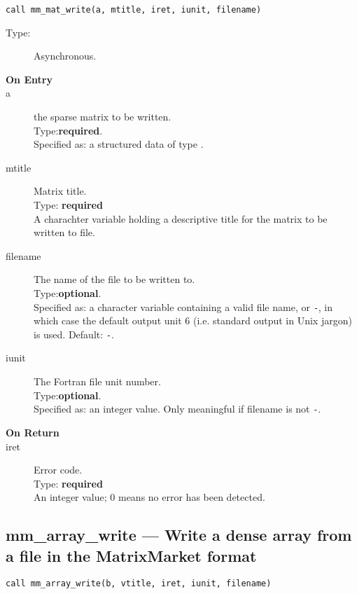 \begin{lstlisting}
call mm_mat_write(a, mtitle, iret, iunit, filename)
\end{lstlisting}
\begin{description}
\item[Type:] Asynchronous.
\item[\bf  On Entry ]
\item[a] the sparse matrix to be written.\\
Type:{\bf required}.\\
Specified as: a structured data of type \spdata.
\item[mtitle] Matrix title.\\
Type: {\bf required} \\
A charachter variable holding a descriptive title for the matrix to be
 written to file.
\item[filename] The name of the file to be written to.\\
Type:{\bf optional}.\\
Specified as: a character variable containing a valid file name, or
\verb|-|, in which case the default output unit  6 (i.e. standard output
in Unix jargon) is used. Default: \verb|-|. 
\item[iunit] The Fortran file unit number.\\
Type:{\bf optional}.\\
Specified as: an integer value. Only meaningful if filename is not \verb|-|.
\end{description}

\begin{description}
\item[\bf On Return]
\item[iret] Error code.\\
Type: {\bf required} \\
An integer value; 0 means no error has been detected. 
\end{description}


\clearpage\subsection{mm\_array\_write ---  Write a dense array from a
  file in the MatrixMarket format}

\begin{lstlisting}
call mm_array_write(b, vtitle, iret, iunit, filename)
\end{lstlisting}

